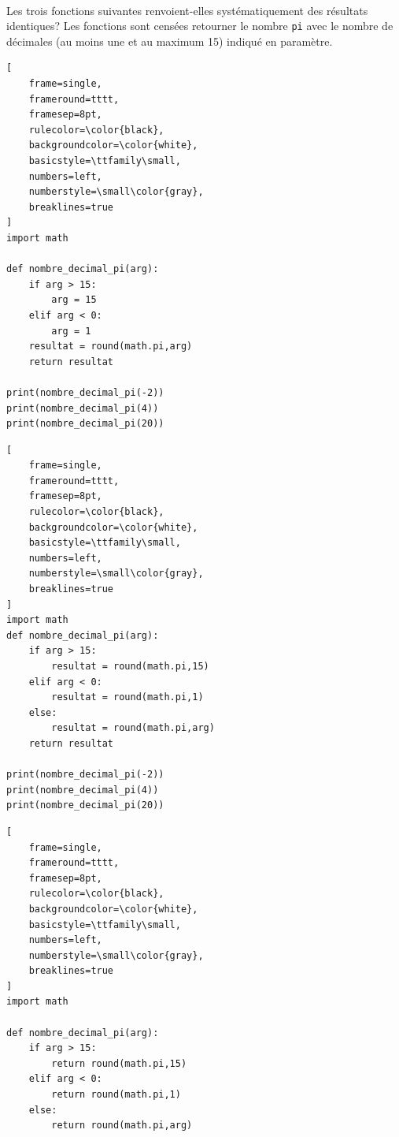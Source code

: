\begin{Exercice}[5 minutes]\\
Les trois fonctions suivantes renvoient-elles systématiquement des résultats identiques? Les fonctions sont censées retourner le nombre \lstinline{pi} avec le nombre de décimales (au moins une et au maximum 15) indiqué en paramètre.
\begin{multicols}{2}
\noindent
\begin{minipage}{0.9\linewidth}
\begin{lstlisting}[
    frame=single,
    frameround=tttt,
    framesep=8pt,
    rulecolor=\color{black},
    backgroundcolor=\color{white},
    basicstyle=\ttfamily\small,
    numbers=left,
    numberstyle=\small\color{gray},
    breaklines=true
]
import math

def nombre_decimal_pi(arg):
    if arg > 15:
        arg = 15
    elif arg < 0:
        arg = 1
    resultat = round(math.pi,arg) 
    return resultat

print(nombre_decimal_pi(-2))
print(nombre_decimal_pi(4))
print(nombre_decimal_pi(20))
\end{lstlisting}
\end{minipage}

\columnbreak

\begin{minipage}{1\linewidth}
\begin{lstlisting}[
    frame=single,
    frameround=tttt,
    framesep=8pt,
    rulecolor=\color{black},
    backgroundcolor=\color{white},
    basicstyle=\ttfamily\small,
    numbers=left,
    numberstyle=\small\color{gray},
    breaklines=true
]
import math
def nombre_decimal_pi(arg):
    if arg > 15:
        resultat = round(math.pi,15)
    elif arg < 0:
        resultat = round(math.pi,1)
    else: 
        resultat = round(math.pi,arg)
    return resultat

print(nombre_decimal_pi(-2))
print(nombre_decimal_pi(4))
print(nombre_decimal_pi(20))
\end{lstlisting}
\end{minipage}
\end{multicols}


\begin{lstlisting}[
    frame=single,
    frameround=tttt,
    framesep=8pt,
    rulecolor=\color{black},
    backgroundcolor=\color{white},
    basicstyle=\ttfamily\small,
    numbers=left,
    numberstyle=\small\color{gray},
    breaklines=true
]
import math

def nombre_decimal_pi(arg):
    if arg > 15:
        return round(math.pi,15)
    elif arg < 0:
        return round(math.pi,1)
    else: 
        return round(math.pi,arg)


\end{lstlisting}
\end{Exercice}
